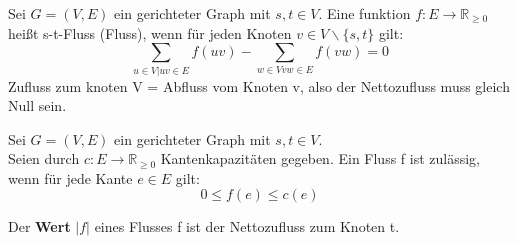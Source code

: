 \documentclass[14pt]{article}
\begin{document}
        \begin{definition}[Fluss]
            Sei $G = (V, E)$ ein gerichteter Graph mit $s, t \in V$. 
            Eine funktion $f : E \rightarrow \mathbb{R}_{\geq 0}$ heißt
            s-t-Fluss (Fluss), wenn für jeden Knoten $v \in V \backslash
            \{ s, t \}$ gilt: 
            \[
                \sum_{u \in V | uv \in E} f(uv) 
                - \sum_{w \in V vw \in E} f(vw) = 0
            \]
            Zufluss zum knoten V = Abfluss vom Knoten v, also der 
            Nettozufluss muss gleich Null sein.
        \end{definition}
        \begin{definition}
            Sei $G = (V, E)$ ein gerichteter Graph mit $s, t \in V$. \\
            Seien durch $c: E \rightarrow \mathbb{R}_{\geq 0}$ Kantenkapazitäten
            gegeben. Ein Fluss f ist zulässig, wenn für jede Kante $e \in E$ gilt:
            \[
                0 \leq f(e) \leq c(e)  
            \]
        \end{definition}
        Der \textbf{Wert} $|f|$ eines Flusses f ist der Nettozufluss 
        zum Knoten t.
\end{document}
